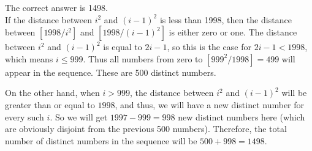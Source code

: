 \begin{solution}
The correct answer is 1498.\\[0.2cm]

If the distance between $i^2$ and $(i-1)^2$ is less than 1998, then the distance between $[1998/i^2]$ and $[1998/(i-1)^2]$ is either zero or one. The distance between $i^2$ and $(i-1)^2$ is equal to $2i-1$, so this is the case for $2i-1 < 1998$, which means $i \leq 999$. Thus all numbers from zero to $[999^2/1998]=499$ will appear in the sequence. These are 500 distinct numbers.

On the other hand, when $i > 999$, the distance between $i^2$ and $(i-1)^2$ will be greater than or equal to $1998$, and thus, we will have a new distinct number for every such $i$. So we will get $1997-999=998$ new distinct numbers here (which are obviously disjoint from the previous 500 numbers). Therefore, the total number of distinct numbers in the sequence will be $500+998=1498$.
\end{solution}